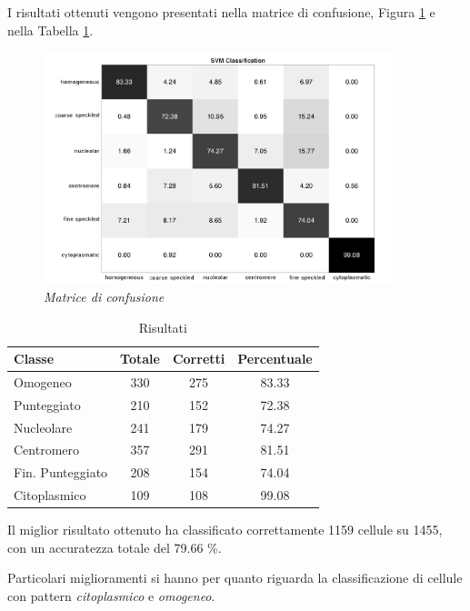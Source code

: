 I risultati ottenuti vengono presentati nella matrice di confusione, Figura \ref{fig:mat2} e nella Tabella \ref{table:2}.

\begin{figure}[H] 
  \centering
    \includegraphics[width=0.9\textwidth]{images/conf_mat_2.png}
    \caption{{\small \textit{Matrice di confusione}}}
    \label{fig:mat2}
\end{figure}

\begin{table}[H]
\centering
\footnotesize
\begin{tabular}{|l | c | c | c |} 
 \hline 
 \textbf{Classe} &  \textbf{Totale} & \textbf{Corretti} & \textbf{Percentuale} \\ [0.5ex] 
 \hline\hline
 Omogeneo & 330 & 275 & 83.33\\
 Punteggiato & 210 & 152 & 72.38\\
 Nucleolare & 241 & 179 & 74.27\\
 Centromero & 357 & 291 & 81.51\\
 Fin. Punteggiato & 208 & 154 & 74.04\\
 Citoplasmico & 109 & 108 & 99.08\\
 \hline
\end{tabular}
\caption{Risultati}
\label{table:2}
\end{table}


Il miglior risultato ottenuto ha classificato correttamente 1159 cellule su 1455, con un accuratezza totale del 79.66 \%.

Particolari miglioramenti si hanno per quanto riguarda la classificazione di cellule con pattern \emph{citoplasmico} e \emph{omogeneo}.



